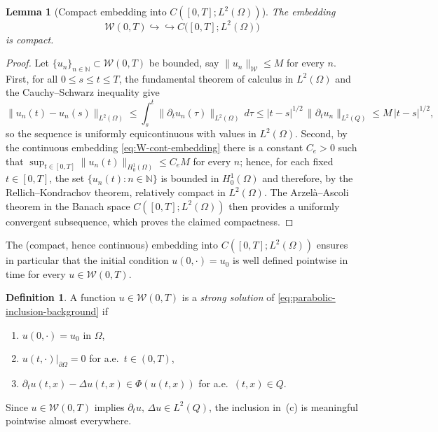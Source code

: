 \documentclass[11pt]{elsarticle}
\newtheorem{lemma}[theorem]{Lemma}
\theoremstyle{definition}
\newtheorem{definition}[theorem]{Definition}
\theoremstyle{remark}
\numberwithin{equation}{section}
\begin{document}
\begin{lemma}[{Compact embedding into $C([0,T];L^2(\Omega))$}]
	\label{lem:compact-embedding}
	The embedding
	\[
	\mathcal{W}(0,T)
	\hookrightarrow\hookrightarrow
	C\bigl([0,T];L^2(\Omega)\bigr)
	\]
	is compact.
\end{lemma}

\begin{proof}
	Let $\{u_n\}_{n\in\mathbb{N}}\subset\mathcal{W}(0,T)$ be bounded, say
	$\|u_n\|_{\mathcal{W}}\le M$ for every $n$. First, for all
	$0\le s\le t\le T$, the fundamental theorem of calculus in
	$L^2(\Omega)$ and the Cauchy--Schwarz inequality give
	\[
	\|u_n(t)-u_n(s)\|_{L^2(\Omega)}
	\le\int_s^t\|\partial_t u_n(\tau)\|_{L^2(\Omega)}\,d\tau
	\le|t-s|^{1/2}\,\|\partial_t u_n\|_{L^2(Q)}
	\le M\,|t-s|^{1/2},
	\]
	so the sequence is uniformly equicontinuous with values in
	$L^2(\Omega)$. Second, by the continuous embedding
	\eqref{eq:W-cont-embedding} there is a constant $C_e>0$ such that
	$\sup_{t\in[0,T]}\|u_n(t)\|_{H_0^1(\Omega)}\le C_eM$ for every $n$;
	hence, for each fixed $t\in[0,T]$, the set
	$\{u_n(t):n\in\mathbb{N}\}$ is bounded in $H_0^1(\Omega)$ and
	therefore, by the Rellich--Kondrachov theorem, relatively compact in
	$L^2(\Omega)$. The Arzel\`a--Ascoli theorem in the Banach space
	$C([0,T];L^2(\Omega))$ then provides a uniformly convergent
	subsequence, which proves the claimed compactness.
\end{proof}

The (compact, hence continuous) embedding into $C([0,T];L^2(\Omega))$
ensures in particular that the initial condition $u(0,\cdot)=u_0$ is well
defined pointwise in time for every $u\in\mathcal{W}(0,T)$.

\begin{definition}\label{def:strong-solution-pde}
	A function $u\in\mathcal{W}(0,T)$ is a \emph{strong solution} of
	\eqref{eq:parabolic-inclusion-background} if
	\begin{enumerate}
		\item[\rm(a)] $u(0,\cdot)=u_0$ in $\Omega$,
		\item[\rm(b)] $u(t,\cdot)|_{\partial\Omega}=0$ for a.e.\ $t\in(0,T)$,
		\item[\rm(c)] $\partial_t u(t,x)-\Delta u(t,x)\in\Phi(u(t,x))$ for
		a.e.\ $(t,x)\in Q$.
	\end{enumerate}
	Since $u\in\mathcal{W}(0,T)$ implies $\partial_t u,\,\Delta u\in L^2(Q)$,
	the inclusion in~(c) is meaningful pointwise almost everywhere.
\end{definition}
\end{document}
